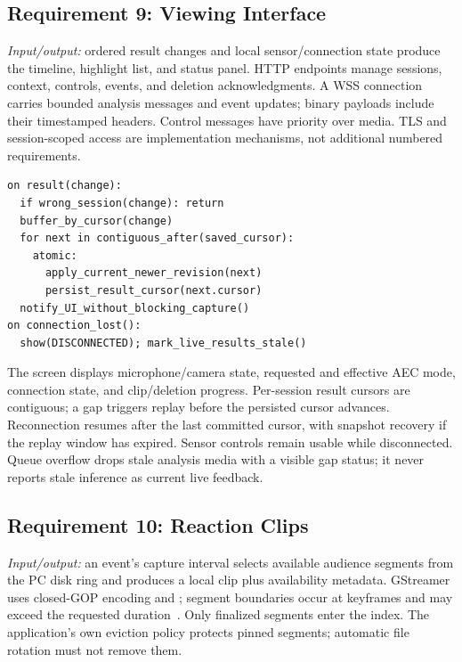 \subsection{Requirement 9: Viewing Interface}
\textit{Input/output:} ordered result changes and local sensor/connection state produce the timeline, highlight list, and status panel. HTTP endpoints manage sessions, context, controls, events, and deletion acknowledgments. A WSS connection carries bounded analysis messages and event updates; binary payloads include their timestamped headers. Control messages have priority over media. TLS and session-scoped access are implementation mechanisms, not additional numbered requirements.
\par\smallskip\noindent\begin{minipage}{\columnwidth}
\begin{lstlisting}
on result(change):
  if wrong_session(change): return
  buffer_by_cursor(change)
  for next in contiguous_after(saved_cursor):
    atomic:
      apply_current_newer_revision(next)
      persist_result_cursor(next.cursor)
  notify_UI_without_blocking_capture()
on connection_lost():
  show(DISCONNECTED); mark_live_results_stale()
\end{lstlisting}
\end{minipage}\par
The screen displays microphone/camera state, requested and effective AEC mode, connection state, and clip/deletion progress. Per-session result cursors are contiguous; a gap triggers replay before the persisted cursor advances. Reconnection resumes after the last committed cursor, with snapshot recovery if the replay window has expired. Sensor controls remain usable while disconnected. Queue overflow drops stale analysis media with a visible gap status; it never reports stale inference as current live feedback.

\subsection{Requirement 10: Reaction Clips}
\textit{Input/output:} an event's capture interval selects available audience segments from the PC disk ring and produces a local clip plus availability metadata. GStreamer uses closed-GOP encoding and ; segment boundaries occur at keyframes and may exceed the requested duration~\cite{gst-ring}. Only finalized segments enter the index. The application's own eviction policy protects pinned segments; automatic file rotation must not remove them.

